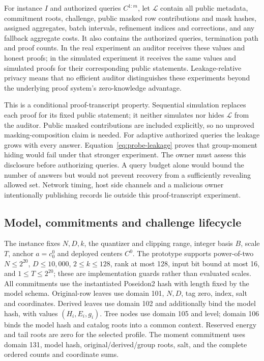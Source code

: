 \begin{definition}
For instance $I$ and authorized queries $C^{1: m}$, let $\mathcal L$ contain
all public metadata, commitment roots, challenge, public masked row
contributions and mask hashes, assigned aggregates, batch intervals,
refinement indices and corrections, and any fallback aggregate costs.
It also contains the authorized queries, termination path and proof counts.
In the real experiment an auditor receives these values and honest proofs;
in the simulated experiment it receives the same values and simulated
proofs for their corresponding public statements. Leakage-relative privacy
means that no efficient auditor distinguishes these experiments beyond the
underlying proof system's zero-knowledge advantage.
\end{definition}
This is a conditional proof-transcript property. Sequential simulation
replaces each proof for its fixed public statement; it neither simulates
nor hides $\mathcal L$ from the auditor. Public masked contributions are
included explicitly, so no unproved masking-composition claim is needed.
For adaptive authorized queries the leakage grows with every answer.
Equation~\eqref{eq:probe-leakage} proves that group-moment hiding would fail
under that stronger experiment. The owner must assess this disclosure before
authorizing queries. A query budget alone would bound the number of answers
but would not prevent recovery from a sufficiently revealing allowed set.
Network timing, host side channels and a malicious owner intentionally
publishing records lie outside this proof-transcript experiment.

\subsection{Model, commitments and challenge lifecycle}
The instance fixes $N,D,k$, the quantizer and clipping range, integer basis
$B$, scale $T$, anchor $a=c^0_0$ and deployed centers $C^0$. The prototype
supports power-of-two $N\leq2^{20}$, $D\leq10,000$, $2\leq k\leq128$,
rank at most 128, input bit bound at most 16, and $1\leq T\leq2^{20}$;
these are implementation guards rather than evaluated scales.
All commitments use the instantiated Poseidon2 hash with length fixed by
the model schema. Original-row leaves use domain 101, $N,D$, tag zero,
index, salt and coordinates. Derived leaves use domain 102 and additionally
bind the model hash, with values $(H_i,E_i,g_i)$. Tree nodes use domain 105
and level; domain 106 binds the model hash and catalog roots into a common
context. Reserved energy and tail roots are zero for the selected profile.
The moment commitment uses domain 131, model hash, original/derived/group
roots, salt, and the complete ordered counts and coordinate sums.

